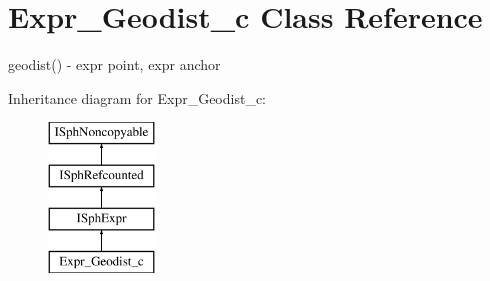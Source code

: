 \hypertarget{classExpr__Geodist__c}{\section{Expr\-\_\-\-Geodist\-\_\-c Class Reference}
\label{classExpr__Geodist__c}
}


geodist() -\/ expr point, expr anchor  


Inheritance diagram for Expr\-\_\-\-Geodist\-\_\-c\-:\begin{figure}[H]
\begin{center}
\leavevmode
\includegraphics[height=4.000000cm]{classExpr__Geodist__c}
\end{center}
\end{figure}
